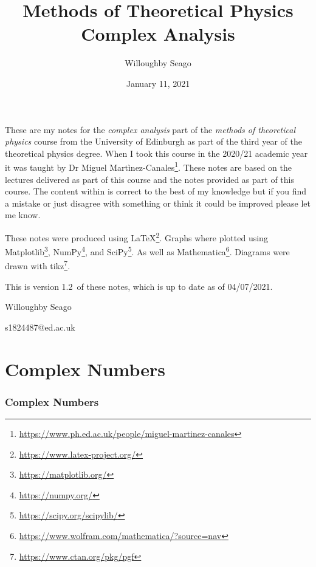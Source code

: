 \documentclass{article}
\author{Willoughby Seago}
\date{January 11, 2021}
\title{
    Methods of Theoretical Physics\\
    {\Large Complex Analysis}
}
\newcommand{\notesVersion}{1.2}
\newcommand{\notesDate}{04/07/2021}
\begin{document}
    \maketitle
    These are my notes for the \textit{complex analysis} part of the \textit{methods of theoretical physics} course from the University of Edinburgh as part of the third year of the theoretical physics degree.
    When I took this course in the 2020/21 academic year it was taught by Dr Miguel Mart\`inez-Canales\footnote{\url{https://www.ph.ed.ac.uk/people/miguel-martinez-canales}}.
    These notes are based on the lectures delivered as part of this course and the notes provided as part of this course.
    The content within is correct to the best of my knowledge but if you find a mistake or just disagree with something or think it could be improved please let me know.
    
    These notes were produced using \LaTeX\footnote{\url{https://www.latex-project.org/}}.
    Graphs where plotted using Matplotlib\footnote{\url{https://matplotlib.org/}}, NumPy\footnote{\url{https://numpy.org/}}, and SciPy\footnote{\url{https://scipy.org/scipylib/}}.
    As well as Mathematica\footnote{\url{https://www.wolfram.com/mathematica/?source=nav}}.
    Diagrams were drawn with tikz\footnote{\url{https://www.ctan.org/pkg/pgf}}.
    
    This is version \notesVersion~of these notes, which is up to date as of \notesDate.
    \begin{flushright}
        Willoughby Seago
        
        s1824487@ed.ac.uk
    \end{flushright}
    \clearpage
    \tableofcontents
    \listoffigures
    \printglossary[type=\acronymtype, title=Acronyms]
    \clearpage
    \begingroup
    \let\clearpage\relax  %
    \endgroup
    \part{Complex Numbers}
    \section{Complex Numbers}
\end{document}
